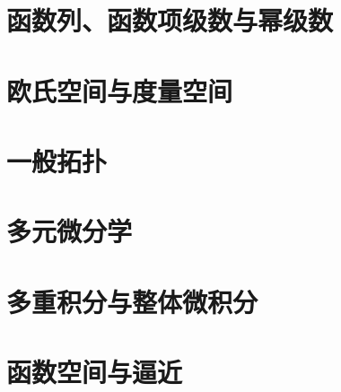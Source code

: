 \documentclass[UTF8,zihao=-4,openany,fontset=fandol]{ctexbook}
\begin{document}
\part{函数列、函数项级数与幂级数}







\part{欧氏空间与度量空间}







\part{一般拓扑}








\part{多元微分学}





\part{多重积分与整体微积分}





\part{函数空间与逼近}



\end{document}
